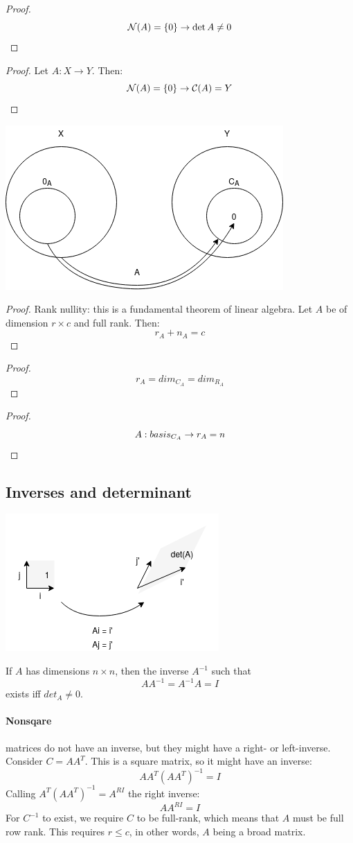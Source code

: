 \begin{proof}
    $$ \mathcal{N}(A) = \{ 0 \} \to \det{A} \neq 0 $$
\end{proof}

\begin{proof}
    Let $A: X \to Y$. Then:
    $$ \mathcal{N}(A) = \{ 0 \} \to \mathcal{C}(A) = Y $$
\end{proof}

\includegraphics[width=0.4\linewidth]{images/A_from_X_to_Y.png}

\begin{proof}
    Rank nullity: this is a fundamental theorem of linear algebra.
    Let $A$ be of dimension $r \times c$ and full rank.
    Then: 
    $$ r_A + n_A = c $$
\end{proof}


\begin{proof}
    $$ r_A = dim_{C_A} = dim_{R_A} $$
\end{proof}

\begin{proof}
    $$ A:basis_{C_A} \to r_A = n $$
\end{proof}


\subsection{Inverses and determinant}

\includegraphics[width=0.4\linewidth]{images/determinant.png}

If $A$ has dimensions $n \times n$, then the inverse $A^{-1}$ such that
$$ A A^{-1} = A^{-1} A = I $$
exists iff $det_A \neq 0$.

\paragraph{Nonsqare} matrices do not have an inverse, but they might have a right- or left-inverse.
Consider $C = A A^T$. This is a square matrix, so it might have an inverse:
$$ A A^T (A A^T)^{-1} = I $$
Calling $A^T (A A^T)^{-1} = A^{RI}$ the right inverse:
$$ A A^{RI} = I $$
For $C^{-1}$ to exist, we require $C$ to be full-rank, which means that $A$ must be full row rank. This  requires $r \leq c$, in other words, $A$ being a broad matrix.

